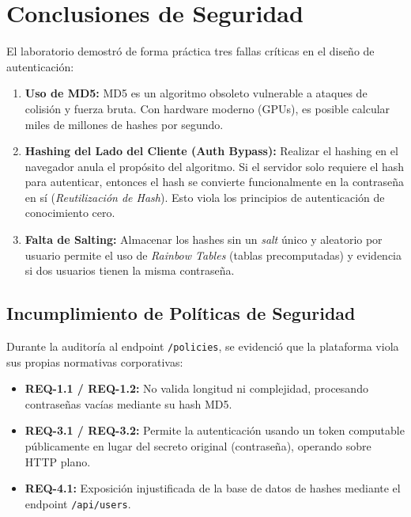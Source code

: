 \documentclass[12pt,a4paper]{article}
\begin{document}
\section{Conclusiones de Seguridad}

El laboratorio demostró de forma práctica tres fallas críticas en el diseño de autenticación:

\begin{enumerate}
    \item \textbf{Uso de MD5:} MD5 es un algoritmo obsoleto vulnerable a ataques de colisión y fuerza bruta. Con hardware moderno (GPUs), es posible calcular miles de millones de hashes por segundo.
    \item \textbf{Hashing del Lado del Cliente (Auth Bypass):} Realizar el hashing en el navegador anula el propósito del algoritmo. Si el servidor solo requiere el hash para autenticar, entonces el hash se convierte funcionalmente en la contraseña en sí (\textit{Reutilización de Hash}). Esto viola los principios de autenticación de conocimiento cero.
    \item \textbf{Falta de Salting:} Almacenar los hashes sin un \textit{salt} único y aleatorio por usuario permite el uso de \textit{Rainbow Tables} (tablas precomputadas) y evidencia si dos usuarios tienen la misma contraseña.
\end{enumerate}

\subsection{Incumplimiento de Políticas de Seguridad}
Durante la auditoría al endpoint \texttt{/policies}, se evidenció que la plataforma viola sus propias normativas corporativas:
\begin{itemize}
    \item \textbf{REQ-1.1 / REQ-1.2:} No valida longitud ni complejidad, procesando contraseñas vacías mediante su hash MD5.
    \item \textbf{REQ-3.1 / REQ-3.2:} Permite la autenticación usando un token computable públicamente en lugar del secreto original (contraseña), operando sobre HTTP plano.
    \item \textbf{REQ-4.1:} Exposición injustificada de la base de datos de hashes mediante el endpoint \texttt{/api/users}.
\end{itemize}
\end{document}
